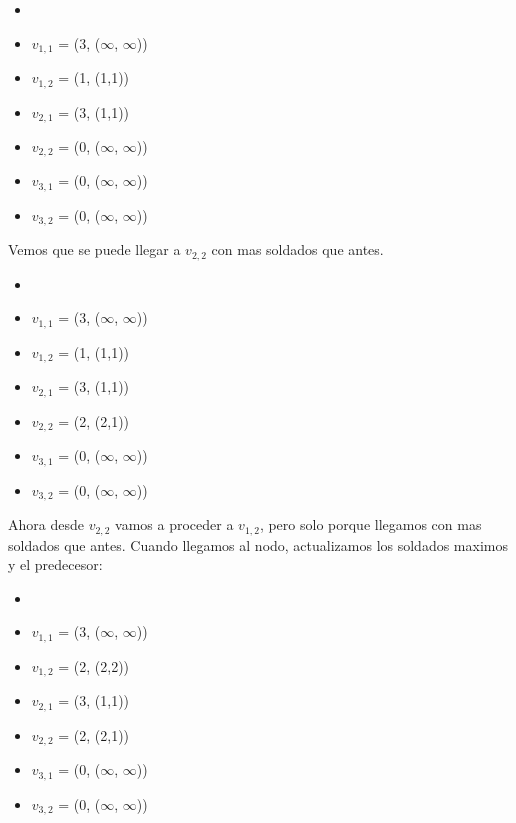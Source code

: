 \begin{multicols}{2}
\columnbreak
\columnbreak
  \begin{itemize}[noitemsep]
      \item[]
      \item $v_{1,1}$ = (3, ($\infty$, $\infty$))
      \item $v_{1,2}$ = (1, (1,1))
      \item $v_{2,1}$ = (3, (1,1))
      \item $v_{2,2}$ = (0, ($\infty$, $\infty$))
      \item $v_{3,1}$ = (0, ($\infty$, $\infty$))
      \item $v_{3,2}$ = (0, ($\infty$, $\infty$))
    \end{itemize}
\end{multicols}

Vemos que se puede llegar a $v_{2,2}$ con mas soldados que antes.

\begin{multicols}{2}
\columnbreak
\columnbreak
  \begin{itemize}[noitemsep]
      \item[]
      \item $v_{1,1}$ = (3, ($\infty$, $\infty$))
      \item $v_{1,2}$ = (1, (1,1))
      \item $v_{2,1}$ = (3, (1,1))
      \item $v_{2,2}$ = (2, (2,1))
      \item $v_{3,1}$ = (0, ($\infty$, $\infty$))
      \item $v_{3,2}$ = (0, ($\infty$, $\infty$))
    \end{itemize}
\end{multicols}

Ahora desde $v_{2,2}$ vamos a proceder a $v_{1,2}$, pero solo porque llegamos con mas soldados que antes. Cuando llegamos al nodo, actualizamos los soldados maximos y el predecesor:

\begin{multicols}{2}
\columnbreak
\columnbreak
  \begin{itemize}[noitemsep]
      \item[]
      \item $v_{1,1}$ = (3, ($\infty$, $\infty$))
      \item $v_{1,2}$ = (2, (2,2))
      \item $v_{2,1}$ = (3, (1,1))
      \item $v_{2,2}$ = (2, (2,1))
      \item $v_{3,1}$ = (0, ($\infty$, $\infty$))
      \item $v_{3,2}$ = (0, ($\infty$, $\infty$))
    \end{itemize}
\end{multicols}

